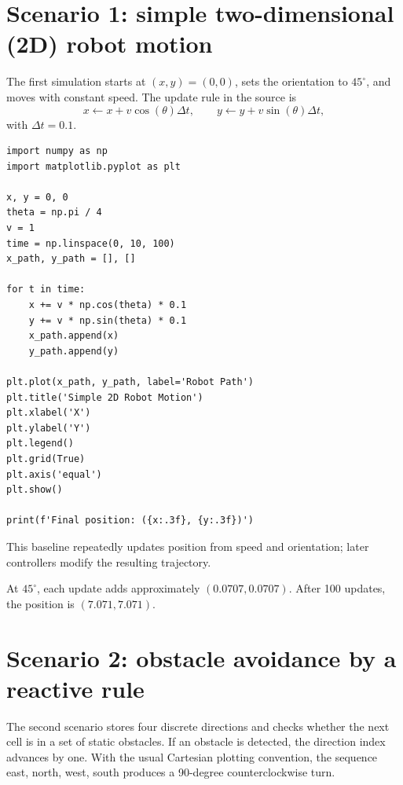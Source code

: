 \section{Scenario 1: simple two-dimensional (2D) robot motion}

The first simulation starts at \((x,y)=(0,0)\), sets the orientation to \(45^\circ\), and moves with constant speed. The update rule in the source is
\[
x\leftarrow x+v\cos(\theta)\Delta t,
\qquad
 y\leftarrow y+v\sin(\theta)\Delta t,
\]
with \(\Delta t=0.1\).

\begin{lstlisting}[style=mlpython]
import numpy as np
import matplotlib.pyplot as plt

x, y = 0, 0
theta = np.pi / 4
v = 1
time = np.linspace(0, 10, 100)
x_path, y_path = [], []

for t in time:
    x += v * np.cos(theta) * 0.1
    y += v * np.sin(theta) * 0.1
    x_path.append(x)
    y_path.append(y)

plt.plot(x_path, y_path, label='Robot Path')
plt.title('Simple 2D Robot Motion')
plt.xlabel('X')
plt.ylabel('Y')
plt.legend()
plt.grid(True)
plt.axis('equal')
plt.show()

print(f'Final position: ({x:.3f}, {y:.3f})')
\end{lstlisting}

\begin{intuition}
This baseline repeatedly updates position from speed and orientation; later controllers modify the resulting trajectory.
\end{intuition}

\begin{workedexample}
At \(45^\circ\), each update adds approximately \((0.0707,0.0707)\). After 100 updates, the position is \((7.071,7.071)\).
\end{workedexample}

\section{Scenario 2: obstacle avoidance by a reactive rule}

The second scenario stores four discrete directions and checks whether the next cell is in a set of static obstacles. If an obstacle is detected, the direction index advances by one. With the usual Cartesian plotting convention, the sequence east, north, west, south produces a 90-degree counterclockwise turn.

